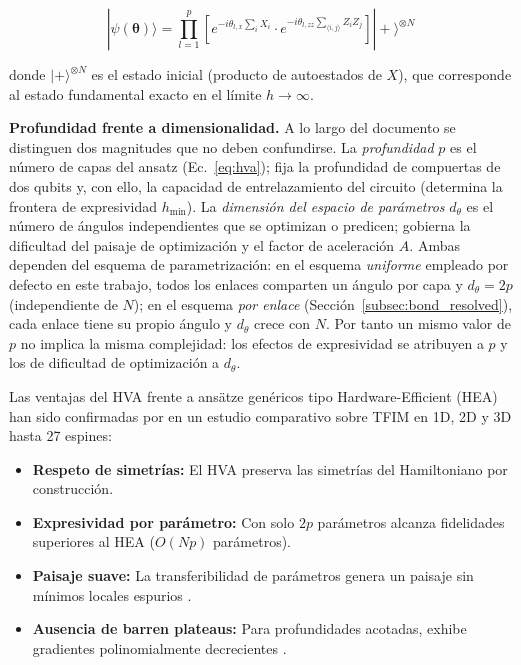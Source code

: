 \documentclass[11pt,a4paper,spanish]{book}
\begin{document}
\begin{equation}
|\psi(\boldsymbol{\theta})\rangle = \prod_{l=1}^{p} \left[ e^{-i\theta_{l,x} \sum_i X_i} \cdot e^{-i\theta_{l,zz} \sum_{\langle i,j \rangle} Z_i Z_j} \right] |+\rangle^{\otimes N}
\label{eq:hva}
\end{equation}

\noindent donde $|+\rangle^{\otimes N}$ es el estado inicial (producto de autoestados de $X$), que corresponde al estado fundamental exacto en el límite $h \to \infty$.

\textbf{Profundidad frente a dimensionalidad.} A lo largo del documento se distinguen dos magnitudes que no deben confundirse. La \emph{profundidad} $p$ es el número de capas del ansatz (Ec.~\ref{eq:hva}); fija la profundidad de compuertas de dos qubits y, con ello, la capacidad de entrelazamiento del circuito (determina la frontera de expresividad $h_{\min}$). La \emph{dimensión del espacio de parámetros} $d_\theta$ es el número de ángulos independientes que se optimizan o predicen; gobierna la dificultad del paisaje de optimización y el factor de aceleración $A$. Ambas dependen del esquema de parametrización: en el esquema \emph{uniforme} empleado por defecto en este trabajo, todos los enlaces comparten un ángulo por capa y $d_\theta = 2p$ (independiente de $N$); en el esquema \emph{por enlace} (Sección~\ref{subsec:bond_resolved}), cada enlace tiene su propio ángulo y $d_\theta$ crece con $N$. Por tanto un mismo valor de $p$ no implica la misma complejidad: los efectos de expresividad se atribuyen a $p$ y los de dificultad de optimización a $d_\theta$.

Las ventajas del HVA frente a ansätze genéricos tipo Hardware-Efficient (HEA) han sido confirmadas por \citet{tripathi2026} en un estudio comparativo sobre TFIM en 1D, 2D y 3D hasta 27 espines:

\begin{itemize}
    \item \textbf{Respeto de simetrías:} El HVA preserva las simetrías del Hamiltoniano por construcción.
    \item \textbf{Expresividad por parámetro:} Con solo $2p$ parámetros alcanza fidelidades superiores al HEA ($O(Np)$ parámetros).
    \item \textbf{Paisaje suave:} La transferibilidad de parámetros genera un paisaje sin mínimos locales espurios \citep{mele2022}.
    \item \textbf{Ausencia de barren plateaus:} Para profundidades acotadas, exhibe gradientes polinomialmente decrecientes \citep{wiersema2020}.
\end{itemize}
\end{document}
